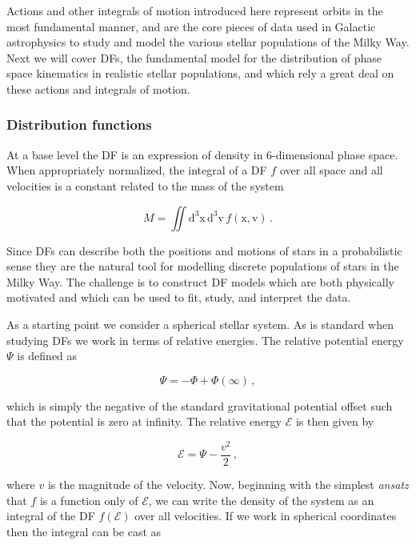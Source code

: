 Actions and other integrals of motion introduced here represent orbits in the most fundamental manner, and are the core pieces of data used in Galactic astrophysics to study and model the various stellar populations of the Milky Way. Next we will cover DFs, the fundamental model for the distribution of phase space kinematics in realistic stellar populations, and which rely a great deal on these actions and integrals of motion.

\subsubsection{Distribution functions}

At a base level the DF is an expression of density in 6-dimensional phase space. When appropriately normalized, the integral of a DF $f$ over all space and all velocities is a constant related to the mass of the system

\begin{equation}
    \label{ch1:eq:df-normalization}
    M = \iint \mathrm{d}^3\mathbf{\mathrm{x}}\, \mathrm{d}^3\mathbf{\mathrm{v}}\, f( \mathbf{\mathrm{x}}, \mathbf{\mathrm{v}}) \,.
\end{equation}

\noindent Since DFs can describe both the positions and motions of stars in a probabilistic sense they are the natural tool for modelling discrete populations of stars in the Milky Way. The challenge is to construct DF models which are both physically motivated and which can be used to fit, study, and interpret the data.

As a starting point we consider a spherical stellar system. As is standard when studying DFs we work in terms of relative energies. The relative potential energy $\Psi$ is defined as 

\begin{equation}
    \label{ch1:eq:relative-potential-energy}
    \Psi = -\Phi + \Phi(\infty)\,,
\end{equation}

\noindent which is simply the negative of the standard gravitational potential offset such that the potential is zero at infinity. The relative energy $\mathcal{E}$ is then given by

\begin{equation}
    \label{ch1:eq:relative-energy}
    \mathcal{E} = \Psi - \frac{v^{2}}{2}\,,
\end{equation}

\noindent where $v$ is the magnitude of the velocity. Now, beginning with the simplest \textit{ansatz} that $f$ is a function only of $\mathcal{E}$, we can write the density of the system as an integral of the DF $f(\mathcal{E})$ over all velocities. If we work in spherical coordinates then the integral can be cast as 


